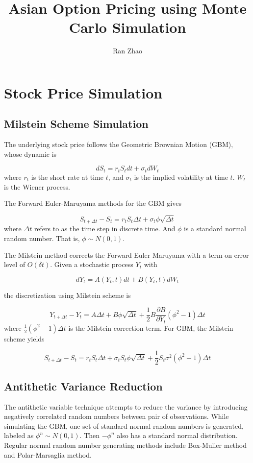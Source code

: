 \documentclass[a4paper,11pt] {article}
\author{Ran Zhao}
\title{Asian Option Pricing using Monte Carlo Simulation}
\date{}
\begin{document}
\maketitle


\section{Stock Price Simulation}
\subsection{Milstein Scheme Simulation}
The underlying stock price follows the Geometric Brownian Motion (GBM), whose dynamic is

\begin{equation} \label{eqn::GBM}
dS_t = r_t S_t dt + \sigma_t dW_t
\end{equation}
where $r_t$ is the short rate at time $t$, and $\sigma_t$ is the implied volatility at time $t$. $W_t$ is the Wiener process.

The Forward Euler-Maruyama methods for the GBM gives

$$
S_{t+\Delta t} - S_t = r_t S_t \Delta t + \sigma_t \phi \sqrt{\Delta t}
$$
where $\Delta t$ refers to as the time step in discrete time. And $\phi$ is a standard normal random number. That is, $\phi \sim N(0,1)$.

The Milstein method corrects the Forward Euler-Maruyama with a term on error level of $O(\delta t)$. Given a stochastic process $Y_t$ with

$$
dY_t = A(Y_t,t) dt + B(Y_t,t)dW_t
$$

the discretization using Milstein scheme is

$$
Y_{t+\Delta t} - Y_t = A \Delta t + B\phi \sqrt{\Delta t} + \frac{1}{2} B \frac{\partial B}{\partial Y_t} (\phi^2 - 1) \Delta t
$$
where $\frac{1}{2}(\phi^2 - 1) \Delta t$ is the Milstein correction term. For GBM, the Milstein scheme yields

$$
S_{t+\Delta t} - S_t = r_t S_t \Delta t + \sigma_t S_t \phi \sqrt{\Delta t} + \frac{1}{2} S_t \sigma^2 (\phi^2-1) \Delta t
$$

\subsection{Antithetic Variance Reduction}
The antithetic variable technique attempts to reduce the variance by introducing negatively correlated random numbers between pair of observations. While simulating the GBM, one set of standard normal random numbers is generated, labeled as $\phi^{n} \sim N(0,1)$. Then $-\phi^{n}$ also has a standard normal distribution. Regular normal random number generating methods include Box-Muller method and Polar-Marsaglia method.
\end{document}
